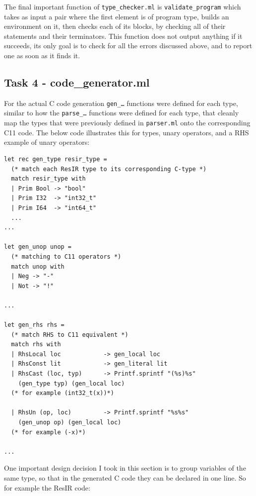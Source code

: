 \documentclass[11pt, a4paper]{article}
\begin{document}
\medskip

The final important function of \texttt{type\_checker.ml} is \texttt{validate\_program} which takes as input a pair where the first element is of program type, 
builds an environment on it, then checks each of its blocks, by checking all of their statements and their terminators. This function does not output anything if it succeeds,
its only goal is to check for all the errors discussed above, and to report one as soon as it finds it.

\medskip

\subsection{Task 4 - code\_generator.ml}

For the actual C code generation \texttt{gen\_\dots} functions were defined for each type, similar to how the \texttt{parse\_\dots} functions were defined for each type, that
cleanly map the types that were previously defined in \texttt{parser.ml} onto the corresponding C11 code. The below code illustrates this for types, unary operators, and a RHS example of unary operators:

\medskip

\begin{lstlisting}[language={[Objective]Caml}]
let rec gen_type resir_type =
  (* match each ResIR type to its corresponding C-type *)
  match resir_type with
  | Prim Bool -> "bool"
  | Prim I32  -> "int32_t"
  | Prim I64  -> "int64_t"
  ...
...

let gen_unop unop =
  (* matching to C11 operators *)
  match unop with
  | Neg -> "-"
  | Not -> "!"

...

let gen_rhs rhs =
  (* match RHS to C11 equivalent *)
  match rhs with
  | RhsLocal loc            -> gen_local loc
  | RhsConst lit            -> gen_literal lit
  | RhsCast (loc, typ)      -> Printf.sprintf "(%s)%s" 
    (gen_type typ) (gen_local loc)
  (* for example (int32_t(x))*)

  | RhsUn (op, loc)         -> Printf.sprintf "%s%s" 
    (gen_unop op) (gen_local loc)
  (* for example (-x)*)

...
\end{lstlisting}

\medskip

One important design decision I took in this section is to group variables of the same type, so that in the generated C code they can be declared in one line.
So for example the ResIR code:
\end{document}
